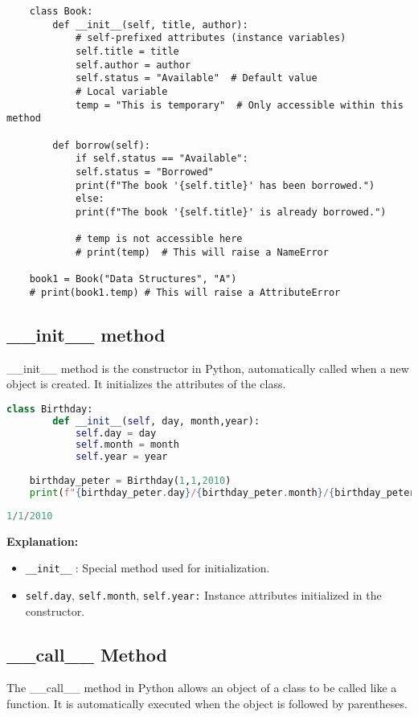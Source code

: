 \begin{lstlisting}
	class Book:
		def __init__(self, title, author):
			# self-prefixed attributes (instance variables)
			self.title = title
			self.author = author
			self.status = "Available"  # Default value
			# Local variable
			temp = "This is temporary"  # Only accessible within this method
			
		def borrow(self):
			if self.status == "Available":
			self.status = "Borrowed"
			print(f"The book '{self.title}' has been borrowed.")
			else:
			print(f"The book '{self.title}' is already borrowed.")
		
			# temp is not accessible here
			# print(temp)  # This will raise a NameError
	
	book1 = Book("Data Structures", "A")
	# print(book1.temp) # This will raise a AttributeError
\end{lstlisting}


\subsection{\_\_init\_\_ method}
\_\_init\_\_ method is the constructor in Python, automatically called when a new object is created. It initializes the attributes of the class.
\begin{lstlisting}[language=python, caption={\_\_init\_\_ method}]
	class Birthday:
		def __init__(self, day, month,year):
			self.day = day
			self.month = month
			self.year = year
			
	birthday_peter = Birthday(1,1,2010)
	print(f"{birthday_peter.day}/{birthday_peter.month}/{birthday_peter.year}")
\end{lstlisting}

\begin{lstlisting}[language=python,caption={Output \_\_init\_\_ method}]
	1/1/2010
\end{lstlisting}
\textbf{Explanation:}
\begin{itemize}
	\item \texttt{\_\_init\_\_} : Special method used for initialization.
	\item \texttt{self.day}, \texttt{self.month}, \texttt{self.year:}  Instance attributes initialized in the constructor.
\end{itemize}

\subsection{\_\_call\_\_ Method}
The \_\_call\_\_ method in Python allows an object of a class to be called like a function. It is automatically executed when the object is followed by parentheses.


